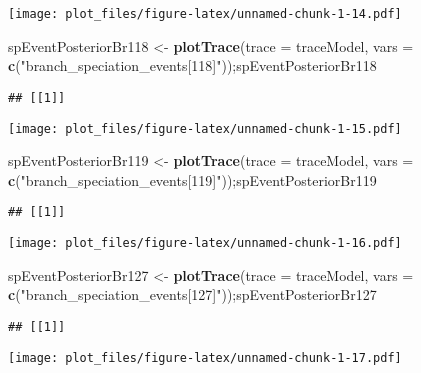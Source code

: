 \documentclass[
]{article}
\newenvironment{Shaded}{\begin{snugshade}}{\end{snugshade}}
\newcommand{\AttributeTok}[1]{\textcolor[rgb]{0.13,0.29,0.53}{#1}}
\newcommand{\FunctionTok}[1]{\textcolor[rgb]{0.13,0.29,0.53}{\textbf{#1}}}
\newcommand{\NormalTok}[1]{#1}
\newcommand{\OtherTok}[1]{\textcolor[rgb]{0.56,0.35,0.01}{#1}}
\newcommand{\StringTok}[1]{\textcolor[rgb]{0.31,0.60,0.02}{#1}}
\begin{document}
\texttt{[image: plot\_files/figure-latex/unnamed-chunk-1-14.pdf]}

\begin{Shaded}
\begin{Highlighting}[]
\NormalTok{spEventPosteriorBr118 }\OtherTok{\textless{}{-}} \FunctionTok{plotTrace}\NormalTok{(}\AttributeTok{trace =}\NormalTok{ traceModel, }
                              \AttributeTok{vars =} \FunctionTok{c}\NormalTok{(}\StringTok{"branch\_speciation\_events[118]"}\NormalTok{));spEventPosteriorBr118}
\end{Highlighting}
\end{Shaded}

\begin{verbatim}
## [[1]]
\end{verbatim}

\texttt{[image: plot\_files/figure-latex/unnamed-chunk-1-15.pdf]}

\begin{Shaded}
\begin{Highlighting}[]
\NormalTok{spEventPosteriorBr119 }\OtherTok{\textless{}{-}} \FunctionTok{plotTrace}\NormalTok{(}\AttributeTok{trace =}\NormalTok{ traceModel, }
                              \AttributeTok{vars =} \FunctionTok{c}\NormalTok{(}\StringTok{"branch\_speciation\_events[119]"}\NormalTok{));spEventPosteriorBr119}
\end{Highlighting}
\end{Shaded}

\begin{verbatim}
## [[1]]
\end{verbatim}

\texttt{[image: plot\_files/figure-latex/unnamed-chunk-1-16.pdf]}

\begin{Shaded}
\begin{Highlighting}[]
\NormalTok{spEventPosteriorBr127 }\OtherTok{\textless{}{-}} \FunctionTok{plotTrace}\NormalTok{(}\AttributeTok{trace =}\NormalTok{ traceModel, }
                              \AttributeTok{vars =} \FunctionTok{c}\NormalTok{(}\StringTok{"branch\_speciation\_events[127]"}\NormalTok{));spEventPosteriorBr127}
\end{Highlighting}
\end{Shaded}

\begin{verbatim}
## [[1]]
\end{verbatim}

\texttt{[image: plot\_files/figure-latex/unnamed-chunk-1-17.pdf]}
\end{document}
